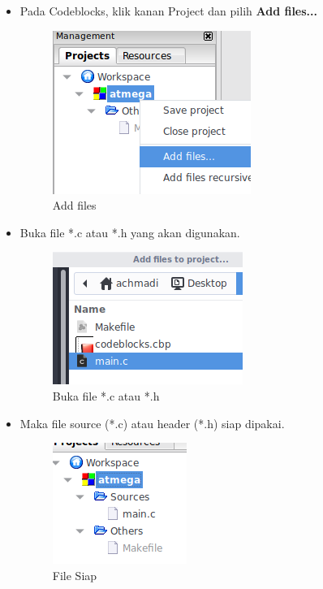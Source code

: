 \documentclass[12pt,]{article}
\begin{document}
	\begin{itemize}

		\item Pada Codeblocks, klik kanan Project dan pilih \textbf{Add files...}

		\begin{figure}[H]
			\centering
			\includegraphics[width=0.5\linewidth]{images/cbp_3}
			\caption{Add files}
		\end{figure}

		\item Buka file *.c atau *.h yang akan digunakan.

		\begin{figure}[H]
			\centering
			\includegraphics[width=0.5\linewidth]{images/cbp_4}
			\caption{Buka file *.c atau *.h}
		\end{figure}

		\newpage
		\item Maka file source (*.c) atau header (*.h) siap dipakai.

		\begin{figure}[H]
			\centering
			\includegraphics[width=0.5\linewidth]{images/cbp_5}
			\caption{File Siap}
		\end{figure}

	\end{itemize}
\end{document}
